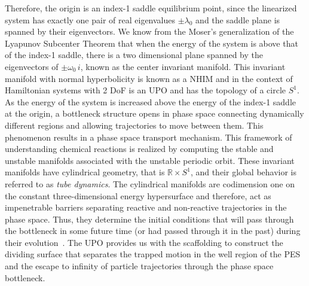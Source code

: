 \documentclass[8pt]{article}
\begin{document}
Therefore, the origin is an index-1 saddle equilibrium point, since the linearized system has exactly one pair of real eigenvalues $ \pm \lambda_0$ and the saddle plane is spanned by their eigenvectors. We know from the Moser's generalization of the Lyapunov Subcenter Theorem \cite{wiggins2013normally,wiggins2003applied} that when the energy of the system is above that of the index-1 saddle, there is a two dimensional plane spanned by the eigenvectors of $\pm \omega_0 \, i$, known as the center invariant manifold. This invariant manifold with normal hyperbolicity is known as a NHIM and in the context of Hamiltonian systems with 2 DoF is an UPO and has the topology of a circle $S^1$. As the energy of the system is increased above the energy of the index-1 saddle at the origin, a bottleneck structure opens in phase space connecting dynamically different regions and allowing trajectories to move between them. This phenomenon results in a phase space transport mechanism. This framework of understanding chemical reactions is realized by computing the stable and unstable manifolds associated with the unstable periodic orbit. These invariant manifolds have cylindrical geometry, that is $\mathbb{R} \times S^1$, and their global behavior is referred to as \textit{tube dynamics}. The cylindrical manifolds are codimension one on the constant three-dimensional energy hypersurface and therefore, act as impenetrable barriers separating reactive and non-reactive trajectories in the phase space. Thus, they determine the initial conditions that will pass through the bottleneck in some future time (or had passed through it in the past) during their evolution~\cite{wiggins_impenetrable_2001}. The UPO provides us with the scaffolding to construct the dividing surface that separates the trapped motion in the well region of the PES and the escape to infinity of particle trajectories through the phase space bottleneck.

\smallskip
\end{document}
